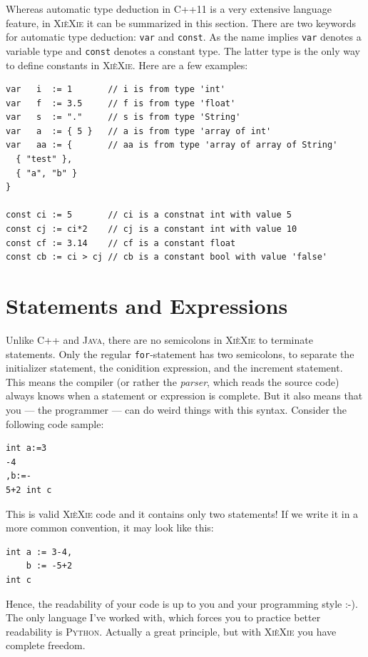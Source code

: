 \documentclass{report}
\def\xiexie{\textsc{Xi\`eXie}\xspace}
\def\cpp{\textsc{C++}\xspace}
\def\cppx{\textsc{C++11}\xspace}
\def\java{\textsc{Java}\xspace}
\def\python{\textsc{Python}\xspace}
\begin{document}
Whereas automatic type deduction in \cppx is a very extensive language feature,
in \xiexie it can be summarized in this section.
There are two keywords for automatic type deduction: \texttt{var} and \texttt{const}. As the name implies
\texttt{var} denotes a variable type and \texttt{const} denotes a constant type. The latter type is the only way
to define constants in \xiexie. Here are a few examples:
\begin{lstlisting}
var   i  := 1       // i is from type 'int'
var   f  := 3.5     // f is from type 'float'
var   s  := "."     // s is from type 'String'
var   a  := { 5 }   // a is from type 'array of int'
var   aa := {       // aa is from type 'array of array of String'
  { "test" },
  { "a", "b" }
}

const ci := 5       // ci is a constnat int with value 5
const cj := ci*2    // cj is a constant int with value 10
const cf := 3.14    // cf is a constant float
const cb := ci > cj // cb is a constant bool with value 'false'
\end{lstlisting}



\section{Statements and Expressions}

Unlike \cpp and \java, there are no semicolons in \xiexie to terminate statements.
Only the regular \texttt{for}-statement has two semicolons, to separate the initializer statement,
the conidition expression, and the increment statement. This means the compiler
(or rather the \textit{parser}, which reads the source code) always knows when a statement or expression is complete.
But it also means that you --- the programmer --- can do weird things with this syntax. Consider the following code sample:
\begin{lstlisting}
int a:=3
-4
,b:=-
5+2 int c
\end{lstlisting}
This is valid \xiexie code and it contains only two statements!
If we write it in a more common convention, it may look like this:
\begin{lstlisting}
int a := 3-4,
    b := -5+2
int c
\end{lstlisting}
Hence, the readability of your code is up to you and your programming style :-). The only language I've worked with,
which forces you to practice better readability is \python.
Actually a great principle, but with \xiexie you have complete freedom.
\end{document}
